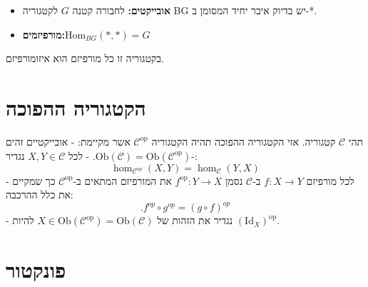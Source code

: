 \documentclass{tstextbook}
\begin{document}
\begin{definition}[הקטגוריה BG]
  \begin{itemize}
    \item \textbf{אובייקטים:} לחבורה קטנה \(G\) לקטגוריה BG יש בדיוק איבר יחיד המסומן ב-*.
    \item \textbf{מורפיזמים:}\({\mathrm{Hom}}_{B G}(*,*)=G\)
  \end{itemize}
\end{definition}
בקטגוריה זו כל מורפיזם הוא איזומורפיזם. 

\section{הקטגוריה ההפוכה}

\begin{definition}
תהי \(\mathcal{C}\) קטגוריה. אזי הקטגוריה ההפוכה תהיה הקטגוריה \(\mathcal{C}^{\text{op}}\) אשר מקיימת:
- אובייקטיים זהים -\(\text{Ob}(\mathcal{C})=\text{Ob}(\mathcal{C}^{\text{op}})\).
- לכל \(X,Y\in \mathcal{C}\) נגדיר:
$$\hom_{{\mathcal{C}}^{o p}}\left(X,Y\right)=\hom_{{\mathcal{C}}}\left(Y,X\right)$$
- לכל מורפיזם \(f:X\to Y\) ב-\(\mathcal{C}\) נסמן \(f^{\text{op}}:Y\to X\) את המורפיזם המתאים ב-\(\mathcal{C}^{\text{op}}\) כך שמקיים את כלל ההרכבה:
$$.f^{o p}\circ g^{o p}=(g\circ f)^{o p}$$
- נגדיר את הזהות של \(X \in \mathrm{Ob}(\mathcal{C}^{\text{op}})=\mathrm{Ob}(\mathcal{C})\) להיות \((\mathrm{Id}_{X})^{\text{op}}\).

\end{definition}
\section{פונקטור}
\end{document}
